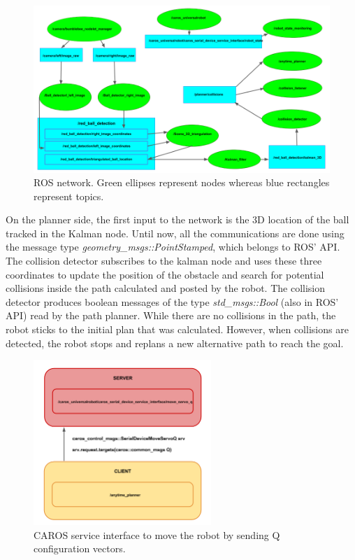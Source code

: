 \begin{figure}[ht!]
    \centering
    \includegraphics[width=1.1\textwidth]{Images/nodes.png}
    \caption{ROS network. Green ellipses represent nodes whereas blue rectangles represent topics.}
    \label{fig:nodes}
\end{figure}

On the planner side, the first input to the network is the 3D location of the ball tracked in the Kalman node. Until now, all the communications are done using the message type \textit{geometry\_msgs::PointStamped}, which belongs to ROS' API. The collision detector subscribes to the kalman node and uses these three coordinates to update the position of the obstacle and search for potential collisions inside the path calculated and posted by the robot. The collision detector produces boolean messages of the type \textit{std\_msgs::Bool} (also in ROS' API) read by the path planner. While there are no collisions in the path, the robot sticks to the initial plan that was calculated. However, when collisions are detected, the robot stops and replans a new alternative path to reach the goal.

\begin{figure}[ht!]
    \centering
    \includegraphics[width=0.6\textwidth]{Images/services.png}
    \caption{CAROS service interface to move the robot by sending Q configuration vectors.}
    \label{fig:services}
\end{figure}

